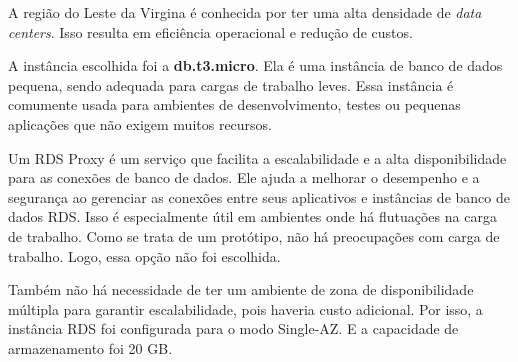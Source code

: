 

A região do Leste da Virgina é conhecida por ter uma alta densidade de \textit{data centers}. Isso resulta em eficiência operacional e redução de custos.

A instância escolhida foi a \textbf{db.t3.micro}. Ela é uma instância de banco de dados pequena, sendo adequada para cargas de trabalho leves. Essa instância é comumente usada para ambientes de desenvolvimento, testes ou pequenas aplicações que não exigem muitos recursos.

Um RDS Proxy é um serviço que facilita a escalabilidade e a alta disponibilidade para as conexões de banco de dados. Ele ajuda a melhorar o desempenho e a segurança ao gerenciar as conexões entre seus aplicativos e instâncias de banco de dados RDS. Isso é especialmente útil em ambientes onde há flutuações na carga de trabalho. Como se trata de um protótipo, não há preocupações com carga de trabalho. Logo, essa opção não foi escolhida.

Também não há necessidade de ter um ambiente de zona de disponibilidade múltipla para garantir escalabilidade, pois haveria custo adicional. Por isso, a instância RDS foi configurada para o modo Single-AZ. E a capacidade de armazenamento foi 20 GB.




